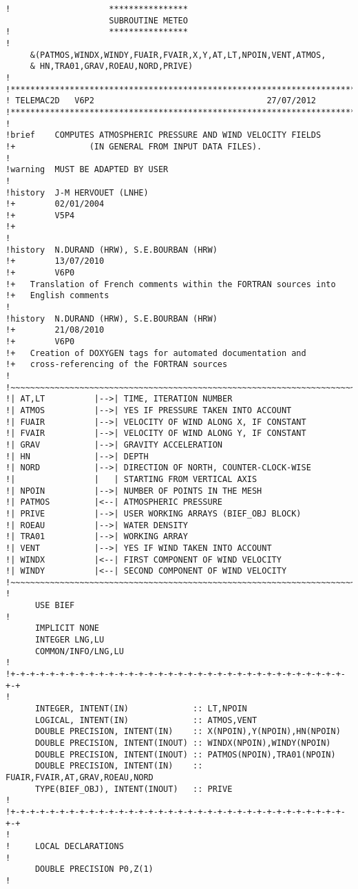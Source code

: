 \begin{lstlisting}
!                    ****************
                     SUBROUTINE METEO
!                    ****************
!
     &(PATMOS,WINDX,WINDY,FUAIR,FVAIR,X,Y,AT,LT,NPOIN,VENT,ATMOS,
     & HN,TRA01,GRAV,ROEAU,NORD,PRIVE)
!
!***********************************************************************
! TELEMAC2D   V6P2                                   27/07/2012
!***********************************************************************
!
!brief    COMPUTES ATMOSPHERIC PRESSURE AND WIND VELOCITY FIELDS
!+               (IN GENERAL FROM INPUT DATA FILES).
!
!warning  MUST BE ADAPTED BY USER
!
!history  J-M HERVOUET (LNHE)
!+        02/01/2004
!+        V5P4
!+
!
!history  N.DURAND (HRW), S.E.BOURBAN (HRW)
!+        13/07/2010
!+        V6P0
!+   Translation of French comments within the FORTRAN sources into
!+   English comments
!
!history  N.DURAND (HRW), S.E.BOURBAN (HRW)
!+        21/08/2010
!+        V6P0
!+   Creation of DOXYGEN tags for automated documentation and
!+   cross-referencing of the FORTRAN sources
!
!~~~~~~~~~~~~~~~~~~~~~~~~~~~~~~~~~~~~~~~~~~~~~~~~~~~~~~~~~~~~~~~~~~~~~~~
!| AT,LT          |-->| TIME, ITERATION NUMBER
!| ATMOS          |-->| YES IF PRESSURE TAKEN INTO ACCOUNT
!| FUAIR          |-->| VELOCITY OF WIND ALONG X, IF CONSTANT
!| FVAIR          |-->| VELOCITY OF WIND ALONG Y, IF CONSTANT
!| GRAV           |-->| GRAVITY ACCELERATION
!| HN             |-->| DEPTH
!| NORD           |-->| DIRECTION OF NORTH, COUNTER-CLOCK-WISE
!|                |   | STARTING FROM VERTICAL AXIS
!| NPOIN          |-->| NUMBER OF POINTS IN THE MESH
!| PATMOS         |<--| ATMOSPHERIC PRESSURE
!| PRIVE          |-->| USER WORKING ARRAYS (BIEF_OBJ BLOCK)
!| ROEAU          |-->| WATER DENSITY
!| TRA01          |-->| WORKING ARRAY
!| VENT           |-->| YES IF WIND TAKEN INTO ACCOUNT
!| WINDX          |<--| FIRST COMPONENT OF WIND VELOCITY
!| WINDY          |<--| SECOND COMPONENT OF WIND VELOCITY
!~~~~~~~~~~~~~~~~~~~~~~~~~~~~~~~~~~~~~~~~~~~~~~~~~~~~~~~~~~~~~~~~~~~~~~~
!
      USE BIEF
!
      IMPLICIT NONE
      INTEGER LNG,LU
      COMMON/INFO/LNG,LU
!
!+-+-+-+-+-+-+-+-+-+-+-+-+-+-+-+-+-+-+-+-+-+-+-+-+-+-+-+-+-+-+-+-+-+-+-+
!
      INTEGER, INTENT(IN)             :: LT,NPOIN
      LOGICAL, INTENT(IN)             :: ATMOS,VENT
      DOUBLE PRECISION, INTENT(IN)    :: X(NPOIN),Y(NPOIN),HN(NPOIN)
      DOUBLE PRECISION, INTENT(INOUT) :: WINDX(NPOIN),WINDY(NPOIN)
      DOUBLE PRECISION, INTENT(INOUT) :: PATMOS(NPOIN),TRA01(NPOIN)
      DOUBLE PRECISION, INTENT(IN)    :: FUAIR,FVAIR,AT,GRAV,ROEAU,NORD
      TYPE(BIEF_OBJ), INTENT(INOUT)   :: PRIVE
!
!+-+-+-+-+-+-+-+-+-+-+-+-+-+-+-+-+-+-+-+-+-+-+-+-+-+-+-+-+-+-+-+-+-+-+-+
!
!     LOCAL DECLARATIONS
!
      DOUBLE PRECISION P0,Z(1)
!
\end{lstlisting}

